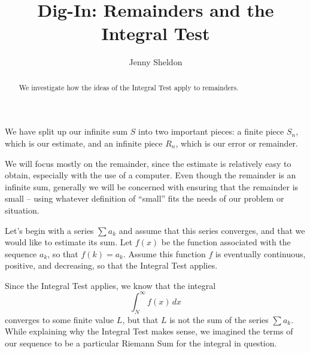\documentclass{ximera}
\title{Dig-In: Remainders and the Integral Test}
\author{Jenny Sheldon}
\begin{document}
\begin{abstract}
    We investigate how the ideas of the Integral Test apply to remainders.
\end{abstract}
\maketitle


We have split up our infinite sum $S$ into two important pieces: a finite piece $S_n$, which is our estimate, and an infinite piece $R_n$, which is our error or remainder.

\begin{image}
  \end{image}


We will focus mostly on the remainder, since the estimate is relatively easy to obtain, especially with the use of a computer.  Even though the remainder is an infinite sum, generally we will be concerned with ensuring that the remainder is small -- using whatever definition of ``small'' fits the needs of our problem or situation.

Let's begin with a series $\sum a_k$ and assume that this series converges, and that we would like to estimate its sum.  Let $f(x)$ be the function associated with the sequence ${a_k}$, so that $f(k) = a_k$.  Assume this function $f$ is eventually continuous, positive, and decreasing, so that the Integral Test applies.

Since the Integral Test applies, we know that the integral
\[
\int_N^{\infty} f(x) \, dx
\]
converges to some finite value $L$, but that $L$ is not the sum of the series $\sum a_k$.  While explaining why the Integral Test makes sense, we imagined the terms of our sequence to be a particular Riemann Sum for the integral in question.
\end{document}

